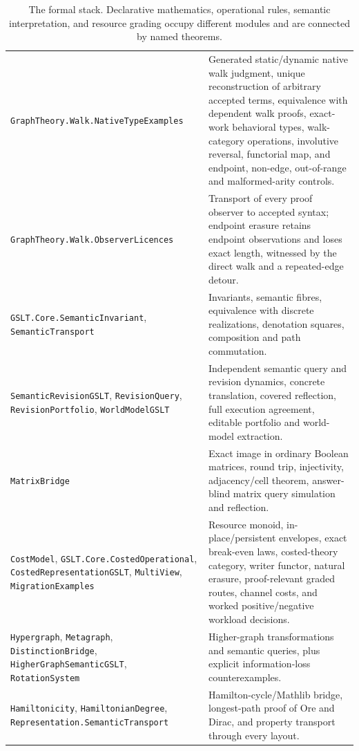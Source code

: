 \documentclass[11pt]{article}
\theoremstyle{remark}
\newcommand{\code}[1]{\texttt{#1}}
\begin{document}
\begin{table}[htbp]
\begin{tabularx}{\textwidth}{@{}>{\raggedright\arraybackslash}p{}
  >{\raggedright\arraybackslash}X@{}}
\code{GraphTheory.Walk.NativeTypeExamples} & Generated static/dynamic native
walk judgment, unique reconstruction of arbitrary accepted terms, equivalence
with dependent walk proofs, exact-work behavioral types, walk-category
operations, involutive reversal, functorial map, and endpoint, non-edge,
out-of-range and malformed-arity controls.\\
\code{GraphTheory.Walk.ObserverLicences} & Transport of every proof observer
to accepted syntax; endpoint erasure retains endpoint observations and loses
exact length, witnessed by the direct walk and a repeated-edge detour.\\
\code{GSLT.Core.SemanticInvariant}, \code{SemanticTransport} & Invariants,
semantic fibres, equivalence with discrete realizations, denotation squares,
composition and path commutation.\\
\code{SemanticRevisionGSLT}, \code{RevisionQuery},
\code{RevisionPortfolio}, \code{WorldModelGSLT} & Independent semantic query
and revision dynamics, concrete translation, covered reflection, full
execution agreement, editable portfolio and world-model extraction.\\
\code{MatrixBridge} & Exact image in ordinary Boolean matrices, round trip,
injectivity, adjacency/cell theorem, answer-blind matrix query simulation and
reflection.\\
\code{CostModel}, \code{GSLT.Core.CostedOperational},
\code{CostedRepresentationGSLT}, \code{MultiView},
\code{MigrationExamples} & Resource monoid,
in-place/persistent envelopes, exact break-even laws, costed-theory category,
writer functor, natural erasure, proof-relevant graded routes, channel costs,
and worked positive/negative workload decisions.\\
\code{Hypergraph}, \code{Metagraph}, \code{DistinctionBridge},
\code{HigherGraphSemanticGSLT}, \code{RotationSystem} & Higher-graph
transformations and semantic queries, plus explicit information-loss
counterexamples.\\
\code{Hamiltonicity}, \code{HamiltonianDegree},
\code{Representation.SemanticTransport} & Hamilton-cycle/Mathlib bridge,
longest-path proof of Ore and Dirac, and property transport through every
layout.\\
\bottomrule
\end{tabularx}
\caption{The formal stack.  Declarative mathematics, operational rules,
semantic interpretation, and resource grading occupy different modules and
are connected by named theorems.}
\label{tab:modules}
\end{table}
\end{document}
